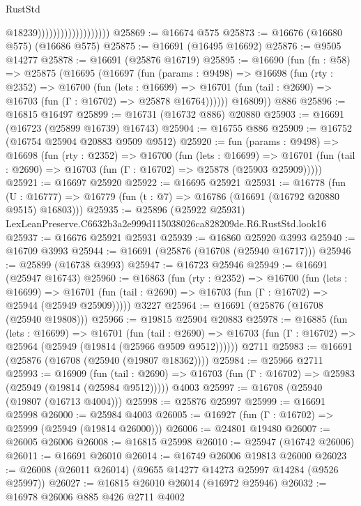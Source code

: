 \begin{lexlean}{RustStd}
\begin{coremodule}
                                          @18239)))))))))))))))))))
@25869 := @16674 @575
@25873 := @16676 (@16680 @575) (@16686 @575)
@25875 := @16691 (@16495 @16692)
@25876 := @9505 @14277
@25878 := @16691 (@25876 @16719)
@25895 := @16690
    (fun (fn : @58) =>
    @25875
      (@16695
        (@16697
          (fun (params : @9498) =>
          @16698
            (fun (rty : @2352) =>
            @16700
              (fun (lets : @16699) =>
              @16701 (fun (tail : @2690) => @16703 (fun (Γ : @16702) => @25878 @16764))))))
        @16809))
    @886
@25896 := @16815 @16497
@25899 := @16731 (@16732 @886) @20880
@25903 := @16691 (@16723 (@25899 @16739) @16743)
@25904 := @16755 @886
@25909 := @16752 (@16754 @25904 @20883 @9509 @9512)
@25920 := fun (params : @9498) =>
  @16698
    (fun (rty : @2352) =>
    @16700
      (fun (lets : @16699) =>
      @16701 (fun (tail : @2690) => @16703 (fun (Γ : @16702) => @25878 (@25903 @25909)))))
@25921 := @16697 @25920
@25922 := @16695 @25921
@25931 := @16778
    (fun (U : @16777) => @16779 (fun (t : @7) => @16786 (@16691 (@16792 @20880 @9515) @16803)))
@25935 := @25896 (@25922 @25931) LexLeanPreserve.C6632b3a2e999d115038026ca828209de.R6.RustStd.look16
@25937 := @16676 @25921 @25931
@25939 := @16860 @25920 @3993
@25940 := @16709 @3993
@25944 := @16691 (@25876 (@16708 (@25940 @16717)))
@25946 := @25899 (@16738 @3993)
@25947 := @16723 @25946
@25949 := @16691 (@25947 @16743)
@25960 := @16863
    (fun (rty : @2352) =>
    @16700
      (fun (lets : @16699) =>
      @16701 (fun (tail : @2690) => @16703 (fun (Γ : @16702) => @25944 (@25949 @25909)))))
    @3227
@25964 := @16691 (@25876 (@16708 (@25940 @19808)))
@25966 := @19815 @25904 @20883
@25978 := @16885
    (fun (lets : @16699) =>
    @16701
      (fun (tail : @2690) =>
      @16703 (fun (Γ : @16702) => @25964 (@25949 (@19814 (@25966 @9509 @9512))))))
    @2711
@25983 := @16691 (@25876 (@16708 (@25940 (@19807 @18362))))
@25984 := @25966 @2711
@25993 := @16909
    (fun (tail : @2690) => @16703 (fun (Γ : @16702) => @25983 (@25949 (@19814 (@25984 @9512)))))
    @4003
@25997 := @16708 (@25940 (@19807 (@16713 @4004)))
@25998 := @25876 @25997
@25999 := @16691 @25998
@26000 := @25984 @4003
@26005 := @16927 (fun (Γ : @16702) => @25999 (@25949 (@19814 @26000)))
@26006 := @24801 @19480
@26007 := @26005 @26006
@26008 := @16815 @25998
@26010 := @25947 (@16742 @26006)
@26011 := @16691 @26010
@26014 := @16749 @26006 @19813 @26000
@26023 := @26008 (@26011 @26014) (@9655 @14277 @14273 @25997 @14284 (@9526 @25997))
@26027 := @16815 @26010 @26014 (@16972 @25946)
@26032 := @16978 @26006 @885 @426 @2711 @4002

\end{coremodule}
\end{lexlean}
